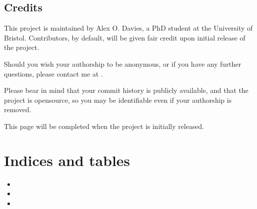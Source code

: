 \documentclass[letterpaper,10pt,english]{sphinxhowto}
\begin{document}
\sphinxstepscope


\subsection{Credits}
\label{\detokenize{credits:credits}}\label{\detokenize{credits::doc}}
\sphinxAtStartPar
This project is maintained by Alex O. Davies, a PhD student at the University of Bristol.
Contributors, by default, will be given fair credit upon initial release of the project.

\sphinxAtStartPar
Should you wish your authorship to be anonymous, or if you have any further questions, please contact me at .

\sphinxAtStartPar
Please bear in mind that your commit history is publicly available, and that the project is open\sphinxhyphen{}source, so you may be identifiable even if your authorship is removed.

\sphinxAtStartPar
This page will be completed when the project is initially released.


\section{Indices and tables}
\label{\detokenize{index:indices-and-tables}}\begin{itemize}
\item {} 
\sphinxAtStartPar
{}

\item {} 
\sphinxAtStartPar
{}

\item {} 
\sphinxAtStartPar
{}

\end{itemize}


\renewcommand{\indexname}{Python Module Index}
\begin{sphinxtheindex}
\let\bigletter\sphinxstyleindexlettergroup
\bigletter{d}
\item\relax{}
\item\relax{}
\item\relax{}
\indexspace
\bigletter{t}
\item\relax{}
\end{sphinxtheindex}

\renewcommand{\indexname}{Index}
\printindex
\end{document}
